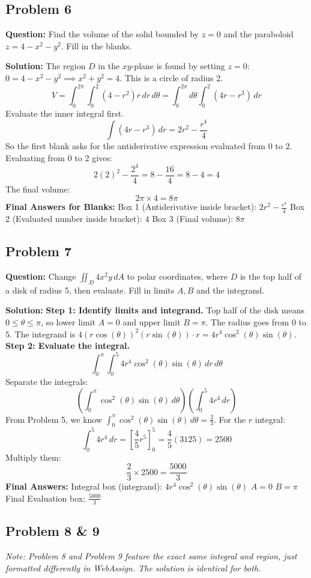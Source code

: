\documentclass[12pt]{article}
\begin{document}
\subsection*{Problem 6}
\textbf{Question:} Find the volume of the solid bounded by $z=0$ and the paraboloid $z = 4 - x^2 - y^2$. Fill in the blanks.

\textbf{Solution:}
The region $D$ in the $xy$-plane is found by setting $z=0$: $0 = 4 - x^2 - y^2 \implies x^2 + y^2 = 4$. This is a circle of radius 2.
\[ V = \int_0^{2\pi} \int_0^2 (4 - r^2)r \, dr \, d\theta = \int_0^{2\pi} d\theta \int_0^2 (4r - r^3) \, dr \]
Evaluate the inner integral first.
\[ \int (4r - r^3) \, dr = 2r^2 - \frac{r^4}{4} \]
So the first blank asks for the antiderivative expression evaluated from $0$ to $2$.
Evaluating from 0 to 2 gives:
\[ 2(2)^2 - \frac{2^4}{4} = 8 - \frac{16}{4} = 8 - 4 = 4 \]
The final volume:
\[ 2\pi \times 4 = 8\pi \]
\textbf{Final Answers for Blanks:}
Box 1 (Antiderivative inside bracket): $2r^2 - \frac{r^4}{4}$
Box 2 (Evaluated number inside bracket): $4$
Box 3 (Final volume): $8\pi$

\subsection*{Problem 7}
\textbf{Question:} Change $\iint_D 4x^2y \, dA$ to polar coordinates, where $D$ is the top half of a disk of radius 5, then evaluate. Fill in limits $A, B$ and the integrand.

\textbf{Solution:}
\textbf{Step 1: Identify limits and integrand.}
Top half of the disk means $0 \le \theta \le \pi$, so lower limit $A = 0$ and upper limit $B = \pi$.
The radius goes from $0$ to $5$.
The integrand is $4(r\cos(\theta))^2(r\sin(\theta)) \cdot r = 4r^4\cos^2(\theta)\sin(\theta)$.
\textbf{Step 2: Evaluate the integral.}
\[ \int_0^{\pi} \int_0^5 4r^4\cos^2(\theta)\sin(\theta) \, dr \, d\theta \]
Separate the integrals:
\[ \left( \int_0^{\pi} \cos^2(\theta)\sin(\theta) \, d\theta \right) \left( \int_0^5 4r^4 \, dr \right) \]
From Problem 5, we know $\int_0^{\pi} \cos^2(\theta)\sin(\theta) \, d\theta = \frac{2}{3}$.
For the $r$ integral:
\[ \int_0^5 4r^4 \, dr = \left[ \frac{4}{5}r^5 \right]_0^5 = \frac{4}{5}(3125) = 2500 \]
Multiply them:
\[ \frac{2}{3} \times 2500 = \frac{5000}{3} \]
\textbf{Final Answers:}
Integral box (integrand): $4r^4\cos^2(\theta)\sin(\theta)$
$A = 0$
$B = \pi$
Final Evaluation box: $\frac{5000}{3}$

\subsection*{Problem 8 \& 9}
\textit{Note: Problem 8 and Problem 9 feature the exact same integral and region, just formatted differently in WebAssign. The solution is identical for both.}
\end{document}
